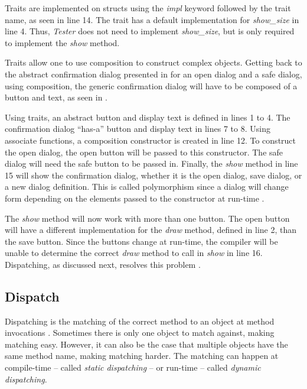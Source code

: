 Traits are implemented on structs using the \textit{impl} keyword followed by the trait name, as seen in line 14.
The  trait has a default implementation for \textit{show\_size} in line 4.
Thus, \textit{Tester} does not need to implement \textit{show\_size}, but is only required to implement the \textit{show} method.

Traits allow one to use composition to construct complex objects.
Getting back to the abstract confirmation dialog presented in  for an open dialog and a safe dialog, using composition, the generic confirmation dialog will have to be composed of a button and text, as seen in .


Using traits, an abstract button and display text is defined in lines 1 to 4.
The confirmation dialog ``has-a'' \cite{malik_09_01} button and display text in lines 7 to 8.
Using associate functions\footnotemark[\ref{associate}], a composition constructor is created in line 12.
To construct the open dialog, the open button will be passed to this constructor.
The safe dialog will need the safe button to be passed in.
Finally, the \textit{show} method in line 15 will show the confirmation dialog, whether it is the open dialog, save dialog, or a new dialog definition.
This is called polymorphism since a dialog will change form depending on the elements passed to the constructor at run-time \cite{savitch_15_01,malik_09_01,gamma_94_01}.

The \textit{show} method will now work with more than one button.
The open button will have a different implementation for the \textit{draw} method, defined in line 2, than the save button.
Since the buttons change at run-time, the compiler will be unable to determine the correct \textit{draw} method to call in \textit{show} in line 16.
Dispatching, as discussed next, resolves this problem \cite{pierce_02_01}.

\subsection{Dispatch}
Dispatching is the matching of the correct method to an object at method invocations \cite{driesen_95_01}.
Sometimes there is only one object to match against, making matching easy.
However, it can also be the case that multiple objects have the same method name, making matching harder.
The matching can happen at compile-time -- called \textit{static dispatching} -- or run-time -- called \textit{dynamic dispatching}.

